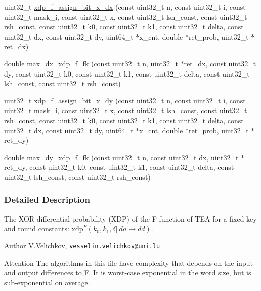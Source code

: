 \begin{DoxyCompactItemize}
\item 
uint32\-\_\-t \hyperlink{xdp-tea-f-fk_8cc_a1115a644e425e49a0302d119e0eb9db0}{xdp\-\_\-f\-\_\-assign\-\_\-bit\-\_\-x\-\_\-dx} (const uint32\-\_\-t n, const uint32\-\_\-t i, const uint32\-\_\-t mask\-\_\-i, const uint32\-\_\-t x, const uint32\-\_\-t lsh\-\_\-const, const uint32\-\_\-t rsh\-\_\-const, const uint32\-\_\-t k0, const uint32\-\_\-t k1, const uint32\-\_\-t delta, const uint32\-\_\-t dx, const uint32\-\_\-t dy, uint64\-\_\-t $\ast$x\-\_\-cnt, double $\ast$ret\-\_\-prob, uint32\-\_\-t $\ast$ret\-\_\-dx)
\item 
double \hyperlink{xdp-tea-f-fk_8cc_af6dac18b8bf6b15b03e2210b186ed2a9}{max\-\_\-dx\-\_\-xdp\-\_\-f\-\_\-fk} (const uint32\-\_\-t n, uint32\-\_\-t $\ast$ret\-\_\-dx, const uint32\-\_\-t dy, const uint32\-\_\-t k0, const uint32\-\_\-t k1, const uint32\-\_\-t delta, const uint32\-\_\-t lsh\-\_\-const, const uint32\-\_\-t rsh\-\_\-const)
\item 
uint32\-\_\-t \hyperlink{xdp-tea-f-fk_8cc_a721c7a6460f6461ab7267f40098734e0}{xdp\-\_\-f\-\_\-assign\-\_\-bit\-\_\-x\-\_\-dy} (const uint32\-\_\-t n, const uint32\-\_\-t i, const uint32\-\_\-t mask\-\_\-i, const uint32\-\_\-t x, const uint32\-\_\-t lsh\-\_\-const, const uint32\-\_\-t rsh\-\_\-const, const uint32\-\_\-t k0, const uint32\-\_\-t k1, const uint32\-\_\-t delta, const uint32\-\_\-t dx, const uint32\-\_\-t dy, uint64\-\_\-t $\ast$x\-\_\-cnt, double $\ast$ret\-\_\-prob, uint32\-\_\-t $\ast$ret\-\_\-dy)
\item 
double \hyperlink{xdp-tea-f-fk_8cc_a14a72673bfe0665f3584a45ed480ead0}{max\-\_\-dy\-\_\-xdp\-\_\-f\-\_\-fk} (const uint32\-\_\-t n, const uint32\-\_\-t dx, uint32\-\_\-t $\ast$ret\-\_\-dy, const uint32\-\_\-t k0, const uint32\-\_\-t k1, const uint32\-\_\-t delta, const uint32\-\_\-t lsh\-\_\-const, const uint32\-\_\-t rsh\-\_\-const)
\end{DoxyCompactItemize}


\subsubsection{\-Detailed \-Description}
\-The \-X\-O\-R differential probability (\-X\-D\-P) of the \-F-\/function of \-T\-E\-A for a fixed key and round constants\-: $\mathrm{xdp}^{F}(k_0, k_1, \delta |~ da \rightarrow dd)$. \begin{DoxyAuthor}{\-Author}
\-V.\-Velichkov, \href{mailto:vesselin.velichkov@uni.lu}{\tt vesselin.\-velichkov@uni.\-lu} 
\end{DoxyAuthor}
\begin{DoxyAttention}{\-Attention}
\-The algorithms in this file have complexity that depends on the input and output differences to \-F. \-It is worst-\/case exponential in the word size, but is sub-\/exponential on average. 
\end{DoxyAttention}


